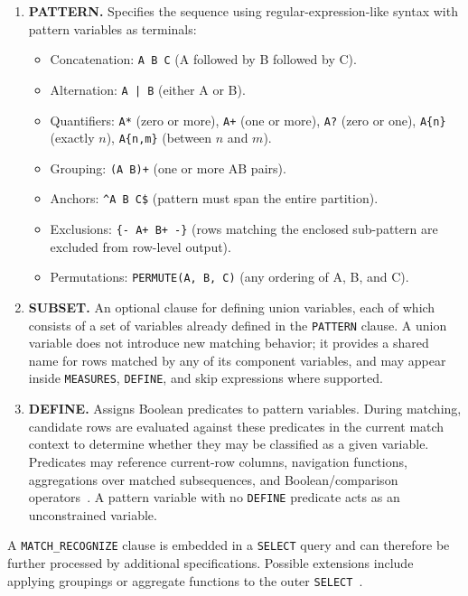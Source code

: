 \begin{enumerate}
\item \textbf{PATTERN.}
  Specifies the sequence using regular-expression-like syntax with
  pattern variables as terminals:
  \begin{itemize}
    \item Concatenation: \texttt{A~B~C} (A followed by B followed by C).
    \item Alternation: \texttt{A~|~B} (either A or B).
    \item Quantifiers: \texttt{A*} (zero or more), \texttt{A+}
      (one or more), \texttt{A?} (zero or one), \texttt{A\{n\}}
      (exactly $n$), \texttt{A\{n,m\}} (between $n$ and $m$).
    \item Grouping: \texttt{(A~B)+} (one or more AB pairs).
    \item Anchors: \texttt{\^{}A~B~C\$} (pattern must span the
      entire partition).
    \item Exclusions: \texttt{\{-~A+~B+~-\}} (rows matching the
      enclosed sub-pattern are excluded from row-level output).
    \item Permutations: \texttt{PERMUTE(A,~B,~C)} (any ordering
      of A, B, and C).
  \end{itemize}

\item \textbf{SUBSET.}
  An optional clause for defining union variables, each of which
  consists of a set of variables already defined in the
  \texttt{PATTERN} clause.  A union variable does not introduce new
  matching behavior; it provides a shared name for rows matched by
  any of its component variables, and may appear inside
  \texttt{MEASURES}, \texttt{DEFINE}, and skip expressions where
  supported.

\item \textbf{DEFINE.}
  Assigns Boolean predicates to pattern variables.  During matching,
  candidate rows are evaluated against these predicates in the
  current match context to determine whether they may be classified
  as a given variable.  Predicates may reference current-row
  columns, navigation functions, aggregations over matched
  subsequences, and Boolean/comparison
  operators~\cite{winand_match_recognize}.  A pattern variable with
  no \texttt{DEFINE} predicate acts as an unconstrained variable.

\end{enumerate}

A \texttt{MATCH\_RECOGNIZE} clause is embedded in a
\texttt{SELECT} query and can therefore be further processed by
additional specifications.  Possible extensions include applying
groupings or aggregate functions to the outer
\texttt{SELECT}~\cite{winand_match_recognize}.

